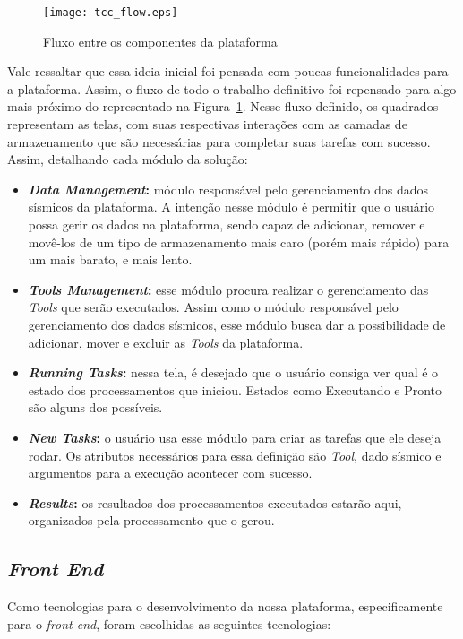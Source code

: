 \documentclass[11pt,twoside]{article}
\begin{document}
\begin{figure}[!h]
  \centering
  \texttt{[image: tcc\_flow.eps]}
  \caption{Fluxo entre os componentes da plataforma}
  \label{fig:flowScreen}
\end{figure}

Vale ressaltar que essa ideia inicial foi pensada com poucas funcionalidades para a plataforma. Assim, o fluxo de todo o trabalho definitivo foi 
repensado para algo mais próximo do representado na Figura~\ref{fig:flowScreen}. Nesse fluxo definido, os quadrados representam as telas, com suas respectivas interações com 
as camadas de armazenamento que são necessárias para completar suas tarefas com sucesso. Assim, detalhando cada módulo da solução:

\begin{itemize}
  \item \textbf{\emph{Data Management}:} módulo responsável pelo gerenciamento dos dados sísmicos da plataforma. A intenção nesse módulo é permitir que o usuário possa
  gerir os dados na plataforma, sendo capaz de adicionar, remover e 
  movê-los de um tipo de armazenamento mais caro (porém mais rápido) para um mais barato, e mais lento. 
  \item \textbf{\emph{Tools Management}:} esse módulo procura realizar o gerenciamento das \emph{Tools} que serão executados. Assim como o módulo responsável pelo gerenciamento
  dos dados sísmicos, esse módulo busca dar a possibilidade de adicionar, mover e excluir as \emph{Tools} da plataforma.
  \item \textbf{\emph{Running Tasks}:} nessa tela, é desejado que o usuário consiga ver qual é o estado dos processamentos que iniciou. Estados como Executando e Pronto são alguns dos 
  possíveis.
  \item \textbf{\emph{New Tasks}:} o usuário usa esse módulo para criar as tarefas que ele deseja rodar. Os atributos necessários para essa definição são \emph{Tool}, dado sísmico 
  e argumentos para a execução acontecer com sucesso. 
  \item \textbf{\emph{Results}:} os resultados dos processamentos executados estarão aqui, organizados pela processamento que o gerou.
\end{itemize}

\subsection{\emph{Front End}}

Como tecnologias para o desenvolvimento da nossa plataforma, especificamente para o \emph{front end}, foram escolhidas as seguintes tecnologias:
\end{document}
